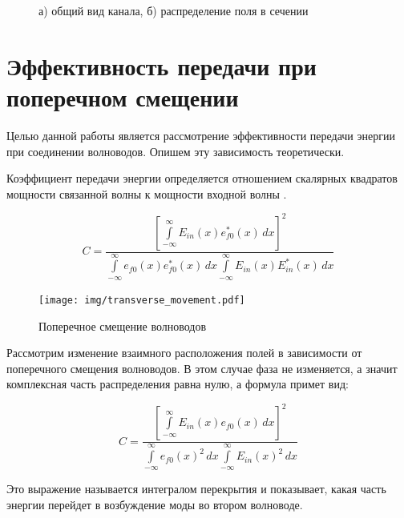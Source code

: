 \begin{figure}[h]
	\begin{minipage}[h]{0.49\linewidth}
	\end{minipage}
	\hfill
	\begin{minipage}[h]{0.49\linewidth}
	\end{minipage}
	\caption{а) общий вид канала, б) распределение поля в сечении}
	\label{polozok}
\end{figure}

\section{Эффективность передачи при поперечном смещении}

Целью данной работы является рассмотрение эффективности передачи энергии при соединении волноводов. Опишем эту зависимость теоретически.

Коэффициент передачи энергии определяется отношением скалярных квадратов мощности связанной волны к мощности входной волны \cite{lefevre}.

\begin{equation}
	\label{coupling_full}
	C = \frac{\left[\int\limits_{-\infty}^{\infty}E_{in}(x)e_{f0}^*(x) \,dx\right]^2}
	{\int\limits_{-\infty}^{\infty}e_{f0}(x)e_{f0}^*(x) \,dx
	 \int\limits_{-\infty}^{\infty}E_{in}(x)E_{in}^*(x) \,dx}
\end{equation}

\begin{figure}[h!]
	\texttt{[image: img/transverse\_movement.pdf]}
	\caption{Поперечное смещение волноводов}
	\label{transverse_movement}
\end{figure}

Рассмотрим изменение взаимного расположения полей в зависимости от поперечного смещения волноводов. В этом случае фаза не изменяется, а значит комплексная часть распределения равна нулю, а формула примет вид:

\begin{equation}
	\label{coupling_natural}
	C = \frac{\left[\int\limits_{-\infty}^{\infty}E_{in}(x)e_{f0}(x) \,dx\right]^2}
	{\int\limits_{-\infty}^{\infty}e_{f0}(x)^2 \,dx
	 \int\limits_{-\infty}^{\infty}E_{in}(x)^2 \,dx}
\end{equation}

Это выражение называется интегралом перекрытия  и показывает, какая часть энергии перейдет в возбуждение моды во втором волноводе. 

